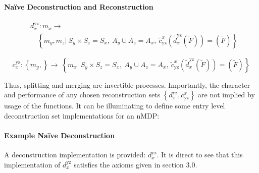 \documentclass[compsoc,journal,letterpaper,10pt,draftcls,twocolumn]{IEEEtran}
\begin{document}
\paragraph{Na\"{i}ve Deconstruction and
Reconstruction}\label{nauxefve-deconstruction-and-reconstruction}
 
\begin{align}
& d_{x}^{\text{yz}}:m_{x} \rightarrow \nonumber \\
&\quad  \left\{ m_{y},m_{z}|\ S_{y} \times S_{z} = S_{x},\ A_{y} \cup A_{z} = A_{x},\ {\tilde{c}}_{\text{yz}}^{x}\left( {\tilde{d}}_{x}^{\text{yz}}\left( \tilde{F} \right) \right) = \left( \tilde{F} \right) \right\} 
\end{align}

\begin{equation}
c_{x}^{\text{yz}}:\left\{ m_{y}, \right\} \rightarrow \ \left\{ m_{x}|\ S_{y} \times S_{z} = S_{x},\ A_{y} \cup A_{z} = A_{x},\ {\tilde{c}}_{\text{yz}}^{x}\left( {\tilde{d}}_{x}^{\text{yz}}\left( \tilde{F} \right) \right) = \left( \tilde{F} \right) \right\} 
\end{equation}

Thus, splitting and merging are invertible processes. Importantly, the
character and performance of any chosen reconstruction sets
\(\left\{ d_{x}^{\text{yz}},c_{\text{yz}}^{x} \right\}\) are not implied
by usage of the functions. It can be illuminating to define some entry
level deconstruction set implementations for an nMDP:

\paragraph{Example Na\"{i}ve
Deconstruction}\label{example-nauxefve-deconstruction}

A deconstruction implementation is provided: \(d_{x}^{\text{yz}}\). It
is direct to see that this implementation of \(d_{x}^{\text{yz}}\)
satisfies the axioms given in section 3.0.
\end{document}
